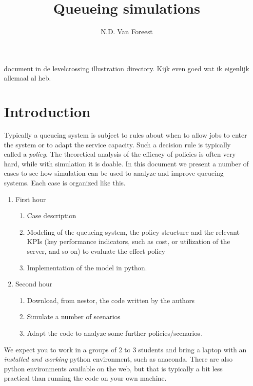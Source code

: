 \documentclass{scrartcl}
\title{Queueing simulations}
\author{N.D. Van Foreest}
\begin{document}
\maketitle


document in de levelcrossing illustration directory. Kijk even goed wat ik eigenlijk allemaal al heb.

\section{Introduction}
Typically a queueing system is subject to rules about when to allow jobs to enter the system or to adapt the service capacity. Such a decision rule is typically called a \emph{policy}.  The theoretical analysis of the efficacy of policies is often very hard, while with simulation it is doable.  In this document we present a number of cases to see how simulation can be used to analyze and improve queueing systems. Each case is organized like this.


\begin{enumerate}
\item First hour
  \begin{enumerate}
\item Case description
\item Modeling of the queueing system, the policy structure and the relevant KPIs (key performance indicators, such as cost, or utilization of the server, and so on) to evaluate the effect policy
\item Implementation of the model in python. 
  \end{enumerate}
\item Second hour
  \begin{enumerate}
  \item Download, from nestor, the code written by the authors
  \item Simulate a number of scenarios
  \item Adapt the code to analyze some further policies/scenarios.
  \end{enumerate}
\end{enumerate}


We expect you to work in a groups of 2 to 3 students and bring a laptop with an \emph{installed and working} python environment, such as anaconda.  There are also python environments available on the web, but that is typically a bit less practical than running the code on your own machine. 
\end{document}
